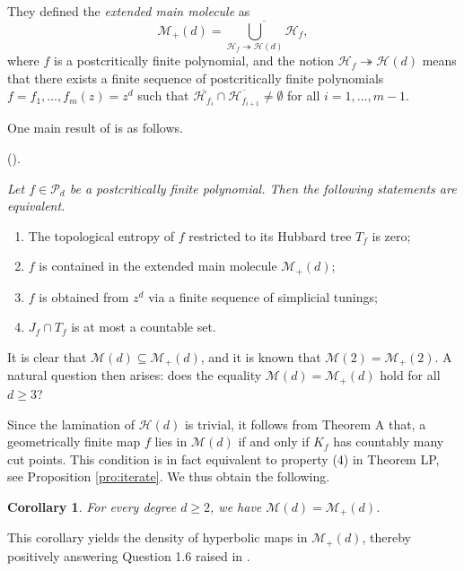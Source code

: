 \documentclass[a4paper,reqno,times, 11pt]{amsart}
\newtheorem{corollary}[theorem]{Corollary}
\theoremstyle{remark}
\theoremstyle{plain}
\numberwithin{equation}{section}
\def\MMMM{{\cal M}}
\def\MMMM{\mathscr M}
\def\HHHH{\mathscr H}
\def\PPPP{\mathscr P}
\def\cal{\mathcal}
\def\ov{\overline}
\begin{document}
	They defined the \emph{extended main molecule} as
	\[{\MMMM}_+(d)=\ov{\bigcup_{\HHHH_f\twoheadrightarrow\HHHH(d)} \HHHH_f},\]
	where $f$ is a postcritically finite polynomial,  and the notion $\HHHH_f\twoheadrightarrow\HHHH(d)$ means that
	there exists a finite sequence of postcritically finite polynomials $f=f_1,\ldots,f_m(z)= z^d$ such that $\overline{\HHHH_{f_i}}\cap \overline{\HHHH_{f_{i+1}}}\not=\emptyset$ for all $i=1,\ldots,m-1$.\vspace{3pt}
	
	One main result of \cite{LP} is as follows.\vspace{8pt}
	
	 (\cite[Theorm 1.1]{LP}).  {\it Let $f\in\PPPP_d$ be a postcritically finite polynomial.
		Then the following statements are equivalent.
		\begin{enumerate}
			\item The topological entropy of $f$ restricted to its Hubbard tree $T_f$ is zero;
			\item $f$ is contained in the extended main molecule $\MMMM_+(d)$;
			\item $f$ is obtained from $z^d$ via a finite sequence of simplicial tunings;
			\item $J_f\cap T_f$ is at most a countable set.
		\end{enumerate}
	}
	\vspace{5pt}
	
	It is clear that  $\MMMM(d)\subseteq {\MMMM}_+(d)$, and it is known that $\MMMM(2)={\MMMM}_+(2)$. A natural question then arises: does the equality $\MMMM(d)={\MMMM}_+(d)$ hold for all $d\geq3$? \vspace{2pt}
	
	Since the lamination of $\HHHH(d)$ is trivial, it follows from Theorem A  that, a geometrically finite map $f$ lies in $\MMMM(d)$ if and only if $K_f$ has countably many cut points. This condition is in fact equivalent to property (4) in Theorem LP, see Proposition \ref{pro:iterate}. We thus obtain the following.
	
	
	\begin{corollary}\label{coro:3}
		For every degree $d\geq 2$, we have $\MMMM(d)={\MMMM}_+(d)$.
	\end{corollary}
	
	This corollary yields the density of  hyperbolic maps in ${\MMMM}_+(d)$, thereby positively answering Question 1.6 raised in \cite{LP}. \vspace{2pt}
	
\end{document}
